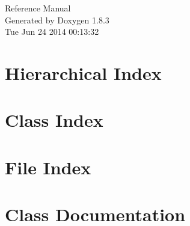 \documentclass{book}
\begin{document}
\hypersetup{pageanchor=false,citecolor=blue}
\begin{titlepage}
\vspace*{7cm}
\begin{center}
{\Large Reference Manual}\\
\vspace*{1cm}
{\large Generated by Doxygen 1.8.3}\\
\vspace*{0.5cm}
{\small Tue Jun 24 2014 00:13:32}\\
\end{center}
\end{titlepage}
\clearemptydoublepage
{}
\tableofcontents
\clearemptydoublepage
{}
\hypersetup{pageanchor=true,citecolor=blue}
\chapter{Hierarchical Index}

\chapter{Class Index}

\chapter{File Index}

\chapter{Class Documentation}





























\end{document}
